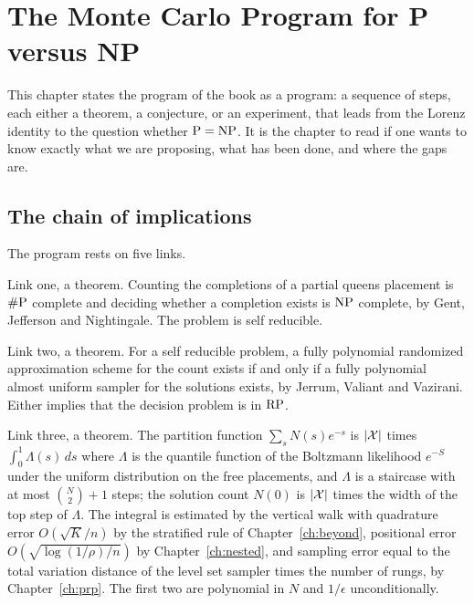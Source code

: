 \chapter{The Monte Carlo Program for P versus NP}
\label{ch:program}

This chapter states the program of the book as a program: a sequence of steps, each either a theorem, a conjecture, or an experiment, that leads from the Lorenz identity to the question whether $\mathrm{P} = \mathrm{NP}$. It is the chapter to read if one wants to know exactly what we are proposing, what has been done, and where the gaps are.

\section{The chain of implications}

The program rests on five links.

Link one, a theorem. Counting the completions of a partial queens placement is $\#\mathrm{P}$ complete and deciding whether a completion exists is $\mathrm{NP}$ complete, by Gent, Jefferson and Nightingale. The problem is self reducible.

Link two, a theorem. For a self reducible problem, a fully polynomial randomized approximation scheme for the count exists if and only if a fully polynomial almost uniform sampler for the solutions exists, by Jerrum, Valiant and Vazirani. Either implies that the decision problem is in $\mathrm{RP}$.

Link three, a theorem. The partition function $\sum_s N(s) e^{-s}$ is $|\mathcal{X}|$ times $\int_0^1 \Lambda(s) \, ds$ where $\Lambda$ is the quantile function of the Boltzmann likelihood $e^{-S}$ under the uniform distribution on the free placements, and $\Lambda$ is a staircase with at most $\binom{N}{2} + 1$ steps; the solution count $N(0)$ is $|\mathcal{X}|$ times the width of the top step of $\Lambda$. The integral is estimated by the vertical walk with quadrature error $O(\sqrt K / n)$ by the stratified rule of Chapter~\ref{ch:beyond}, positional error $O(\sqrt{\log(1/\rho) / n})$ by Chapter~\ref{ch:nested}, and sampling error equal to the total variation distance of the level set sampler times the number of rungs, by Chapter~\ref{ch:prp}. The first two are polynomial in $N$ and $1/\epsilon$ unconditionally.

